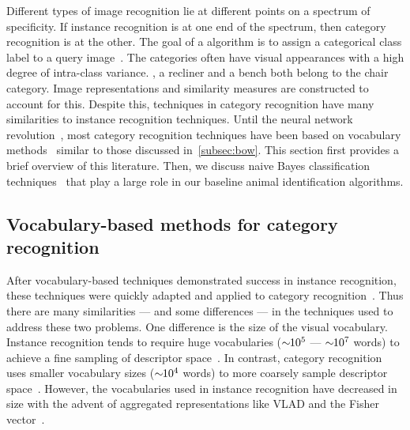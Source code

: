     Different types of image recognition lie at different points on a spectrum of specificity. If instance
    recognition is at one end of the spectrum, then category recognition is at the other. The goal of a
     algorithm is to assign a categorical class label to a query
    image~\cite{everingham_pascal_2010, everingham_pascal_2015, russakovsky_imagenet_2014, deng_imagenet_2009,
    fei_fei_one_shot_2006, griffin_caltech_256_2007}. The categories often have visual appearances with a high
    degree of intra-class variance. \Eg{}, a recliner and a bench both belong to the chair category. Image
    representations and similarity measures are constructed to account for this. Despite this, techniques in
    category recognition have many similarities to instance recognition techniques. Until the neural network
    revolution~\cite{krizhevsky_imagenet_2012}, most category recognition techniques have been based on vocabulary
    methods~\cite{csurka_visual_2004, yang_linear_2009, sanchez_compressed_2013, russakovsky_imagenet_2014,
    krizhevsky_imagenet_2012} similar to those discussed in~\cref{subsec:bow}. This section first provides a brief
    overview of this literature. Then, we discuss naive Bayes classification
    techniques~\cite{boiman_defense_2008,mccann_local_2012} that play a large role in our baseline animal
    identification algorithms.

    \subsection{Vocabulary-based methods for category recognition}
        After vocabulary-based techniques demonstrated success in instance recognition, these techniques were
        quickly adapted and applied to category recognition~\cite{csurka_visual_2004}. Thus there are many
        similarities --- and some differences --- in the techniques used to address these two problems. One
        difference is the size of the visual vocabulary. Instance recognition tends to require huge vocabularies
        ($\sim\mkern-6mu 10^{5}$ --- $\sim\mkern-6mu 10^{7}$ words) to achieve a fine sampling of descriptor
        space~\cite{nister_scalable_2006, philbin_object_2007}. In contrast, category recognition uses smaller
        vocabulary sizes ($\sim\mkern-6mu 10^{4}$ words) to more coarsely sample descriptor
        space~\cite{zhang_local_2006}. However, the vocabularies used in instance recognition have decreased in
        size with the advent of aggregated representations like VLAD and the Fisher
        vector~\cite{arandjelovic_all_2013, sanchez_compressed_2013}.

